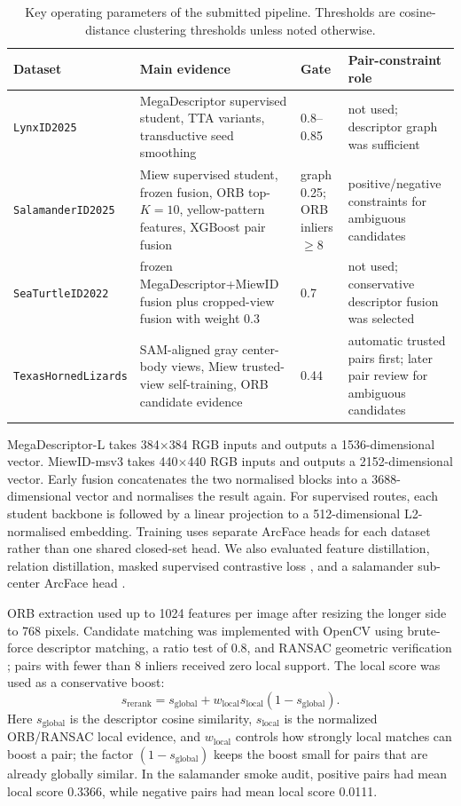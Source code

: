 \documentclass{ceurart}
\newcommand{\dataset}[1]{\texttt{#1}}
\begin{document}
\begin{table}[h]
  \centering
  \caption{Key operating parameters of the submitted pipeline. Thresholds are cosine-distance clustering thresholds unless noted otherwise.}
  \label{tab:key-params}
  \small
  \begin{tabularx}{\linewidth}{lYlY}
    \toprule
    Dataset & Main evidence & Gate & Pair-constraint role \\
    \midrule
    \dataset{LynxID2025} & MegaDescriptor supervised student, TTA variants, transductive seed smoothing & 0.8--0.85 & not used; descriptor graph was sufficient \\
    \dataset{SalamanderID2025} & Miew supervised student, frozen fusion, ORB top-$K=10$, yellow-pattern features, XGBoost pair fusion & graph 0.25; ORB inliers $\geq$8 & positive/negative constraints for ambiguous candidates \\
    \dataset{SeaTurtleID2022} & frozen MegaDescriptor+MiewID fusion plus cropped-view fusion with weight 0.3 & 0.7 & not used; conservative descriptor fusion was selected \\
    \dataset{TexasHornedLizards} & SAM-aligned gray center-body views, Miew trusted-view self-training, ORB candidate evidence & 0.44 & automatic trusted pairs first; later pair review for ambiguous candidates \\
    \bottomrule
  \end{tabularx}
\end{table}

MegaDescriptor-L takes 384$\times$384 RGB inputs and outputs a 1536-dimensional vector. MiewID-msv3 takes 440$\times$440 RGB inputs and outputs a 2152-dimensional vector. Early fusion concatenates the two normalised blocks into a 3688-dimensional vector and normalises the result again. For supervised routes, each student backbone is followed by a linear projection to a 512-dimensional L2-normalised embedding. Training uses separate ArcFace heads \cite{arcface} for each dataset rather than one shared closed-set head. We also evaluated feature distillation, relation distillation, masked supervised contrastive loss \cite{supcon}, and a salamander sub-center ArcFace head \cite{arcface}.

ORB extraction used up to 1024 features per image after resizing the longer side to 768 pixels. Candidate matching was implemented with OpenCV \cite{opencv} using brute-force descriptor matching, a ratio test of 0.8, and RANSAC geometric verification \cite{ransac}; pairs with fewer than 8 inliers received zero local support. The local score was used as a conservative boost:
\begin{equation}
  s_{\mathrm{rerank}} = s_{\mathrm{global}} + w_{\mathrm{local}} s_{\mathrm{local}} (1 - s_{\mathrm{global}}).
\end{equation}
Here $s_{\mathrm{global}}$ is the descriptor cosine similarity, $s_{\mathrm{local}}$ is the normalized ORB/RANSAC local evidence, and $w_{\mathrm{local}}$ controls how strongly local matches can boost a pair; the factor $(1-s_{\mathrm{global}})$ keeps the boost small for pairs that are already globally similar.
In the salamander smoke audit, positive pairs had mean local score 0.3366, while negative pairs had mean local score 0.0111.
\end{document}
